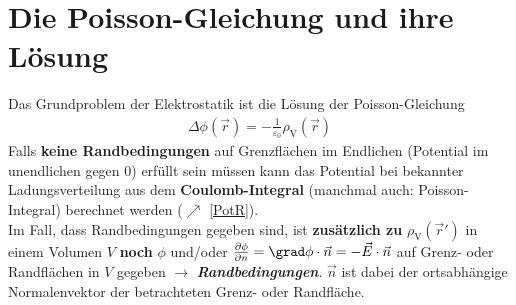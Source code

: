 \section{Die Poisson-Gleichung und ihre Lösung}\label{poilsg}
	  Das Grundproblem der Elektrostatik ist die Lösung der	Poisson-Gleichung
	  \begin{equation}\begin{split}
			  \Delta \phi(\vec{r} ) = -\frac{1}{\varepsilon_0}
			  \rho_\text{V} (\vec{r} )
		  \end{split}\end{equation}
	  Falls \textbf{keine Randbedingungen} auf Grenzflächen im Endlichen (Potential im unendlichen gegen 0)
	  erfüllt sein müssen kann das Potential bei bekannter
	  Ladungsverteilung aus dem \textbf{Coulomb-Integral} (manchmal auch:
	  Poisson-Integral) berechnet werden ($\nearrow$ \ref{PotR}).\\
	  Im Fall, dass Randbedingungen gegeben sind, ist \textbf{zusätzlich zu} $\rho_\text{V}(\vec{r}' )$ in einem Volumen $V$ \textbf{noch} $\phi$ und/oder $\frac{\partial\phi}{\partial n}=\grad \phi\cdot\vec{n}=-\vec{E} \cdot \vec{n}$ auf Grenz- oder Randflächen in $V$ gegeben $\to$ \textbf{\textit{Randbedingungen}}. $\vec{n}$ ist dabei der ortsabhängige Normalenvektor der betrachteten Grenz- oder Randfläche.
